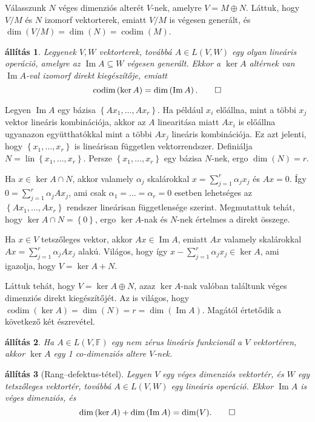 \documentclass[9pt, a4paper, showtrims]{memoir}
\makeatletter
\renewenvironment{proof}[1][\proofname]
    {\par\pushQED{\qed}%
    \normalfont \topsep6\p@\@plus6\p@\relax
    \trivlist
    \item[\hskip\labelsep
        \itshape
    #1\@addpunct{:}]\ignorespaces}
    {\popQED\endtrivlist\@endpefalse}
\theoremstyle{plain}
\newtheorem{proposition}{állítás}[chapter]
\theoremstyle{remark}
\theoremstyle{definition}
\DeclareMathOperator{\lin}{lin}
\DeclareMathOperator{\codim}{codim}
\DeclareMathOperator{\im}{Im}
\makeatother
\begin{document}
\begin{proof}
	Válasszunk $N$ véges dimenziós alterét $V$-nek,
	amelyre $V=M\oplus N$.
	Láttuk, hogy $V/M$ és $N$ izomorf vektorterek,
	emiatt $V/M$ is végesen generált, és
	$\dim \left( V/M \right)=\dim(N)=\codim(M)$.
\end{proof}
\begin{proposition}
	Legyenek $V,W$ vektorterek,
	továbbá $A\in L\left( V,W \right)$ egy olyan lineáris operáció,
	amelyre az $\im A\subseteq W$ végesen generált.
	Ekkor a $\ker A$ altérnek van $\im A$-val izomorf direkt kiegészítője, emiatt
	\[
		\codim\left( \ker A \right)=\dim\left( \im A \right).\qedhere
	\]
\end{proposition}
\begin{proof}
	Legyen $\im A$ egy bázisa $\left\{ Ax_1,\ldots,Ax_r \right\}$.
    Ha például $x_i$ előállna, mint a többi $x_j$ vektor lineáris kombinációja,
    akkor az $A$ linearitása miatt $Ax_i$ is előállna ugyanazon együtthatókkal mint a többi $Ax_j$
    lineáris kombinációja.
    Ez azt jelenti, hogy $\left\{ x_1,\ldots,x_r \right\}$ is lineárisan független vektorrendszer.
	Definiálja $N=\lin\left\{ x_1,\ldots,x_r \right\}$.
    Persze $\left\{ x_1,\ldots,x_r \right\}$ egy bázisa $N$-nek,
    ergo $\dim(N)=r$.

	Ha $x\in\ker A\cap N$, akkor valamely $\alpha_j$ skalárokkal
	$x=\sum_{j=1}^r\alpha_jx_j$ és $Ax=0$.
	Így $0=\sum_{j=1}^r\alpha_jAx_j$, ami csak $\alpha_1=\dots=\alpha_r=0$
	esetben lehetséges az $\left\{ Ax_1,\ldots,Ax_r \right\}$ rendszer lineárisan függetlensége szerint.
    Megmutattuk tehát, hogy $\ker A\cap N=\left\{ 0 \right\}$, ergo $\ker A$-nak és $N$-nek értelmes a direkt összege.

	Ha $x\in V$ tetszőleges vektor, akkor $Ax\in\im A$, emiatt
	$Ax$ valamely skalárokkal $Ax=\sum_{j=1}^r\alpha_jAx_j$ alakú.
	Világos, hogy így $x-\sum_{j=1}^r\alpha_jx_j\in\ker A$,
	ami igazolja, hogy $V=\ker A+N$.

	Láttuk tehát, hogy $V=\ker A\oplus N$, azaz $\ker A$-nak valóban találtunk véges dimenziós direkt kiegészítőjét.
	Az is világos, hogy $\codim\left( \ker A \right)=\dim(N)=r=\dim\left( \im A \right)$.
\end{proof}
Magától értetődik a következő két észrevétel.
\begin{proposition}
	Ha $A\in L\left( V,\mathbb{F} \right)$ egy nem zérus lineáris funkcionál a $V$ vektortéren,
	akkor $\ker A$ egy 1 co-dimenziós altere $V$-nek.
\end{proposition}
\begin{proposition}[Rang--defektus-tétel]
	Legyen $V$ egy véges dimenziós vektortér,
	és $W$ egy tetszőleges vektortér,
	továbbá $A\in L\left( V,W \right)$ egy lineáris operáció.
	Ekkor
	$\im A$ is véges dimenziós, és
	\[
		\dim\left( \ker A \right)+\dim\left( \im A \right)=\dim(V).\qedhere
	\]
\end{proposition}
\end{document}
